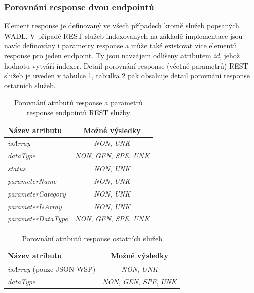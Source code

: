 \documentclass[czech,DP]{thesiskiv}
\begin{document}
\subsubsection{Porovnání response dvou endpointů}

Element response je definovaný ve všech případech kromě služeb popsaných WADL. V případě REST služeb indexovaných na základě implementace jsou navíc definovány i parametry response a může také existovat více elementů response pro jeden endpoint. Ty jsou navzájem odlišeny atributem \textit{id}, jehož hodnotu vytváří indexer. Detail porovnání response (včetně parametrů) REST služeb je uveden v tabulce \ref{tab:resp-rest-cmp}, tabulka \ref{tab:resp-ws-cmp} pak obsahuje detail porovnání response ostatních služeb.

\begin{table}[h]
	\centering
	\begin{tabular}{|l|c|}
		\hline
		Název atributu & Možné výsledky \\
		\hline
		\hline
		\textit{isArray} & \textit{NON}, \textit{UNK} \\
		\hline
		\textit{dataType} &  \textit{NON}, \textit{GEN}, \textit{SPE}, \textit{UNK} \\
		\hline
		\textit{status} &  \textit{NON}, \textit{UNK} \\
		\hline
		\textit{parameterName} & \textit{NON}, \textit{UNK} \\
		\hline
		\textit{parameterCategory} & \textit{NON}, \textit{UNK} \\
		\hline
		\textit{parameterIsArray} &  \textit{NON}, \textit{UNK} \\
		\hline
		\textit{parameterDataType} & \textit{NON}, \textit{GEN}, \textit{SPE}, \textit{UNK} \\
		\hline
	\end{tabular}
	\caption{Porovnání atributů response a parametrů response endpointů REST služby}
	\label{tab:resp-rest-cmp}
\end{table}

\begin{table}[h]
	\centering
	\begin{tabular}{|l|c|}
		\hline
		Název atributu & Možné výsledky \\
		\hline
		\hline
		\textit{isArray} (pouze JSON-WSP) & \textit{NON}, \textit{UNK} \\
		\hline
		\textit{dataType} & \textit{NON}, \textit{GEN}, \textit{SPE}, \textit{UNK} \\
		\hline
	\end{tabular}
	\caption{Porovnání atributů response ostatních služeb}
	\label{tab:resp-ws-cmp}
\end{table}
\end{document}
